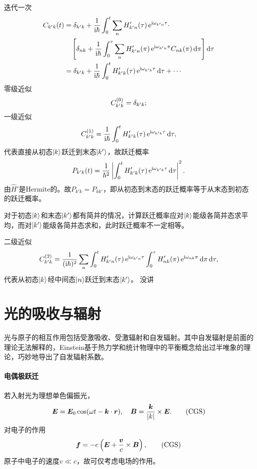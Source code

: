 迭代一次
\begin{align*}
	C_{k'k}(t)&=\vd_{k'k}+\frac1{\i\hbar}\int_0^t\sum_nH'_{k'n}(\tau)\e{\i\omega_{k'n}\tau}\cdot\\
	&\quad\fkh{\vd_{nk}+\frac1{\i\hbar}\int_0^\tau\sum_nH'_{k'n}(\pi)\e{\i\omega_{k'n}\pi}C_{nk}(\pi)\d\pi}\d\tau\\
	&=\vd_{k'k}+\frac1{\i\hbar}\int_0^tH'_{k'k}(\tau)\e{\i\omega_{k'k}\tau}\d\tau+\cdots
\end{align*}
零级近似
\[
C_{k'k}^{(0)}=\mathop{}\!\delta_{k'k};
\]
一级近似 
\[
C_{k'k}^{(1)}=\frac1{\mathrm{i}\hbar}\int_0^tH'_{k'k}(\tau)\mathop{}\!\mathrm{e}^{\mathrm{i}\omega_{k'k}\tau}\mathop{}\!\mathrm{d}\tau,
\]
代表直接从初态$\left\vert k\right\rangle$跃迁到末态$\left\vert k'\right\rangle$，故跃迁概率
\begin{align}
	P_{k'k}(t)=\frac1{\hbar^2}\left\lvert\int_0^tH'_{k'k}(\tau)\mathop{}\!\mathrm{e}^{\mathrm{i}\omega_{k'k}\tau}\mathop{}\!\mathrm{d}\tau\right\rvert^2.
\end{align}
由$\hat H'$是Hermite的。故$P_{k'k}=P_{kk'}$，即从初态到末态的跃迁概率等于从末态到初态的跃迁概率。

对于初态$\left\vert k\right\rangle$和末态$\left\vert k'\right\rangle$都有简并的情况，计算跃迁概率应对$\left\vert k\right\rangle$能级各简并态求平均，而对$\left\vert k'\right\rangle$能级各简并态求和，此时跃迁概率不一定相等。

二级近似
\[
C_{k'k}^{(2)}=\frac1{(\mathrm{i}\hbar)^2}\sum_n\int_0^tH'_{k'n}(\tau)\mathop{}\!\mathrm{e}^{\mathrm{i}\omega_{k'n}\tau}\int_0^\tau H'_{nk}(\pi)\mathop{}\!\mathrm{e}^{\mathrm{i}\omega_{nk}\pi}\mathop{}\!\mathrm{d}\pi\mathop{}\!\mathrm{d}\tau,
\]
代表从初态$\left\vert k\right\rangle$经中间态$\left\vert n\right\rangle$跃迁到末态$\left\vert k'\right\rangle$。
没讲
\section{光的吸收与辐射}
光与原子的相互作用包括受激吸收、受激辐射和自发辐射。其中自发辐射是前面的理论无法解释的，Einstein基于热力学和统计物理中的平衡概念给出过半唯象的理论，巧妙地导出了自发辐射系数。
\paragraph{电偶极跃迁}若入射光为理想单色偏振光，
\[
	\bm E=\bm E_0\cos(\omega t-\bm k\cdot\bm r),\quad\bm B=\frac{\bm k}{\abs k}\times\bm E.\CGS
\]
对电子的作用 
\[
	\bm f=-e\kh{\bm E+\frac{\bm v}c\times\bm B},\CGS
\]
原子中电子的速度$v\ll c$，故可仅考虑电场的作用。

